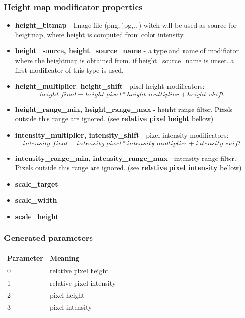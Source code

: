 \documentclass[9pt]{article}
\begin{document}
\subsubsection*{Height map modificator properties}
\begin{itemize}

\item{\bf height\_bitmap} - Image file (png, jpg,...) witch will be used as 
source for heigtmap, where height is computed from color intensity.

\item{\bf height\_source, height\_source\_name} - a type and name of modifiator 
where the heightmap is obtained from. if height\_source\_name is unset, a first
modificator of this type is used.

\item{\bf height\_multiplier, height\_shift} - pixel height modificators:
\[
height\_final = height\_pixel * height\_multiplier + height\_shift
\]

\item{\bf height\_range\_min, height\_range\_max} - height range filter. Pixels
outside this range are ignored. (see {\bf relative pixel height} bellow)

\item{\bf intensity\_multiplier, intensity\_shift} - pixel intensity modificators:
\[
intensity\_final = intensity\_pixel * intensity\_multiplier + intensity\_shift
\]

\item{\bf intensity\_range\_min, intensity\_range\_max} - intensity range filter. Pixels
outside this range are ignored. (see {\bf relative pixel intensity} bellow)

\item{\bf scale\_target}
\item{\bf scale\_width}
\item{\bf scale\_height}
\end{itemize}

\subsubsection*{Generated parameters}

\begin{center}
\begin{tabular}{|l||l|}
\hline
  Parameter & Meaning \\
\hline
\hline
  0 & relative pixel height \\
  1 & relative pixel intensity \\
  2 & pixel height \\
  3 & pixel intensity \\
\hline
\end{tabular}
\end{center}
\end{document}
